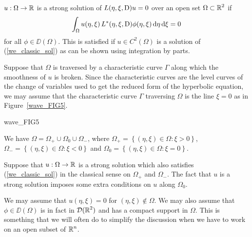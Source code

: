 $u:\Omega \to \mathbb{R}$ is a strong solution of $L(\eta,\xi,\operatorname{D})u=0$
over an open set $\displaystyle \Omega \subset \mathbb{R}^2$ if
\begin{equation} \label{we_strong_sol}
\int_\Omega u(\eta,\xi)\, L^\ast(\eta,\xi,\operatorname{D})\phi(\eta,\xi)
\,\mathrm{d}{\eta}\,\mathrm{d}{\xi} = 0
\end{equation}
for all $\phi \in \DD(\Omega)$.  This is satisfied if
$\displaystyle u \in C^2(\Omega)$ is a solution of
(\ref{we_classic_sol}) as can be shown using integration by parts.

Suppose that $\Omega$ is traversed by a characteristic curve $\Gamma$
along which the smoothness of $u$ is broken.  Since the characteristic
curves are the level curves of the change of variables used to get the
reduced form of the hyperbolic equation, we may assume that the
characteristic curve $\Gamma$ traversing $\Omega$ is the line $\xi=0$
as in Figure~\ref{wave_FIG5}.

{wave_FIG5}

We have $\Omega = \Omega_+ \cup \Omega_0 \cup \Omega_-$, where
$\displaystyle \Omega_+ = \left\{ (\eta,\xi) \in \Omega : \xi>0 \right\}$,
$\displaystyle \Omega_- = \left\{ (\eta,\xi) \in \Omega : \xi<0 \right\}$
and $\Omega_0 = \left\{ (\eta,\xi) \in \Omega : \xi=0 \right\}$.

Suppose that $u:\Omega \to \mathbb{R}$ is a strong solution which also satisfies
(\ref{we_classic_sol}) in the classical sense on $\Omega_+$ and
$\Omega_-$.  The fact that $u$ is a strong solution imposes some extra
conditions on $u$ along $\Omega_0$.

We may assume that $u(\eta,\xi) = 0$ for $(\eta,\xi) \not\in \Omega$.
We may also assume that $\phi \in \DD(\Omega)$ is in fact
in $\displaystyle \mathcal{D}(\mathbb{R}^2)$ and has a compact support in $\Omega$.  This is
something that we will often do to simplify the discussion when we
have to work on an open subset of $\displaystyle \mathbb{R}^n$.

